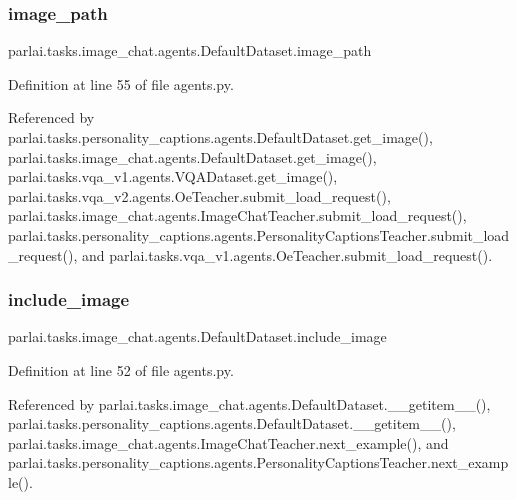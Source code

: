 \subsubsection{\texorpdfstring{image\+\_\+path}{image\_path}}
{\footnotesize\ttfamily parlai.\+tasks.\+image\+\_\+chat.\+agents.\+Default\+Dataset.\+image\+\_\+path}



Definition at line 55 of file agents.\+py.



Referenced by parlai.\+tasks.\+personality\+\_\+captions.\+agents.\+Default\+Dataset.\+get\+\_\+image(), parlai.\+tasks.\+image\+\_\+chat.\+agents.\+Default\+Dataset.\+get\+\_\+image(), parlai.\+tasks.\+vqa\+\_\+v1.\+agents.\+V\+Q\+A\+Dataset.\+get\+\_\+image(), parlai.\+tasks.\+vqa\+\_\+v2.\+agents.\+Oe\+Teacher.\+submit\+\_\+load\+\_\+request(), parlai.\+tasks.\+image\+\_\+chat.\+agents.\+Image\+Chat\+Teacher.\+submit\+\_\+load\+\_\+request(), parlai.\+tasks.\+personality\+\_\+captions.\+agents.\+Personality\+Captions\+Teacher.\+submit\+\_\+load\+\_\+request(), and parlai.\+tasks.\+vqa\+\_\+v1.\+agents.\+Oe\+Teacher.\+submit\+\_\+load\+\_\+request().

\mbox{\label{classparlai_1_1tasks_1_1image__chat_1_1agents_1_1DefaultDataset_a3efeafee8792c6e993c00b2efd0e0105}} 
\subsubsection{\texorpdfstring{include\+\_\+image}{include\_image}}
{\footnotesize\ttfamily parlai.\+tasks.\+image\+\_\+chat.\+agents.\+Default\+Dataset.\+include\+\_\+image}



Definition at line 52 of file agents.\+py.



Referenced by parlai.\+tasks.\+image\+\_\+chat.\+agents.\+Default\+Dataset.\+\_\+\+\_\+getitem\+\_\+\+\_\+(), parlai.\+tasks.\+personality\+\_\+captions.\+agents.\+Default\+Dataset.\+\_\+\+\_\+getitem\+\_\+\+\_\+(), parlai.\+tasks.\+image\+\_\+chat.\+agents.\+Image\+Chat\+Teacher.\+next\+\_\+example(), and parlai.\+tasks.\+personality\+\_\+captions.\+agents.\+Personality\+Captions\+Teacher.\+next\+\_\+example().

